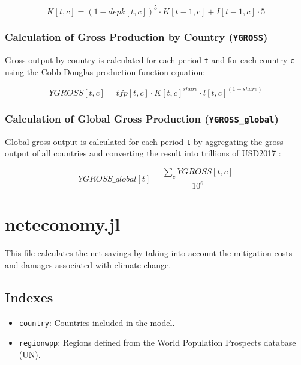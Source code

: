 \documentclass[
]{article}
\providecommand{\tightlist}{%
  \setlength{\itemsep}{0pt}\setlength{\parskip}{0pt}}
\begin{document}
\begin{equation}
 K[t,c] = (1 - depk[t,c])^5 \cdot K[t-1,c] + I[t-1,c] \cdot 5
\end{equation}


\subsubsection{\texorpdfstring{Calculation of Gross Production by Country
(\texttt{YGROSS})}{Calculation of Gross Production by Country (YGROSS)}}\label{calculation-of-gross-production-by-country-ygross}

Gross output by country is calculated for each period \texttt{t} and for
each country \texttt{c} using the Cobb-Douglas production function
equation:

\begin{equation}
 YGROSS[t,c] = tfp[t,c] \cdot K[t,c]^{share} \cdot l[t,c]^{(1-share)} 
\end{equation}


\subsubsection{\texorpdfstring{Calculation of Global Gross Production
(\texttt{YGROSS\_global})}{Calculation of Global Gross Production (YGROSS\_global)}}\label{calculation-of-global-gross-production-ygross_global}

Global gross output is calculated for each period \texttt{t} by
aggregating the gross output of all countries and converting the result
into trillions of USD2017 :

\begin{equation}
 YGROSS\_global[t] = \frac{\sum_{c} YGROSS[t,c]}{10^6}
\end{equation}


\section{neteconomy.jl}\label{neteconomy.jl}

This file calculates the net savings by taking into account the
mitigation costs and damages associated with climate change.

\subsection{Indexes}\label{indexes-3}

\begin{itemize}
\tightlist
\item
  \texttt{country}: Countries included in the model.
\item
  \texttt{regionwpp}: Regions defined from the World Population Prospects database (UN).
\end{itemize}
\end{document}
